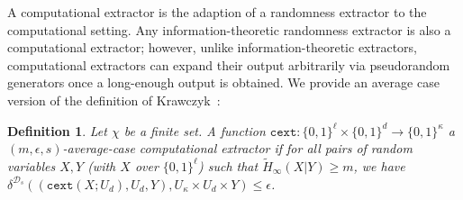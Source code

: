 \documentclass[11pt]{article}
\newcommand{\defref}[1]{\mbox{Definition~\ref{#1}}}
\newcommand{\class}[1]{{\ensuremath{\mathsf{#1}}}}
\newcommand{\gen}{\ensuremath{\class{Gen}}\xspace}
\newcommand{\rep}{\ensuremath{\class{Rep}}\xspace}
\newcommand{\zo}{\ensuremath{\{0, 1\}}}
\newcommand{\dis}{\ensuremath{\mathsf{dis}}}
\newcommand{\hill}{\ensuremath{\mathtt{HILL}}\xspace}
\newcommand{\cext}{\ensuremath{\mathtt{cext}}}
\newtheorem{definition}[theorem]{Definition}
\begin{document}
\iffalse
\begin{definition}
\label{def:comp fuzzy cond}
Let $\mathcal{W}$ be a family of probability distributions over $\mathcal{M}$.  A pair of randomized procedures ``generate'' ($\gen$) and ``reproduce'' ($\rep$) is an $(\mathcal{M}, \mathcal{W}, \tilde{m}, t$)-computational fuzzy conductor that is $(\epsilon, s)$-hard with error $\delta$ if $\gen$ and $\rep$ satisfy the following properties (the first two properties are the same as in \defref{def:comp fuzzy extractor}, with $x$ replacing $r$):
\begin{itemize}
\item The generate procedure $\gen$ on input $w\in \mathcal{M}$ outputs a string $x\in\{0,1\}^\ell$ and a helper string $p\in\{0,1\}^*$.
\item The reproduction procedure $\rep$ takes an element $w'\in\mathcal{M}$ and a bit string $p\in\{0,1\}^*$ as inputs.  The \emph{correctness} property guarantees that if $\dis(w, w')\leq t$ and $(x, p)\leftarrow \gen(w)$, then $\Pr[\rep(w',p) = x] \geq 1-\delta$ where the probability is over the randomness of $(\gen, \rep)$.
If $\dis(w, w') > t$, then no guarantee is provided about the output of $\rep$.
\item The \emph{security} property guarantees that for any distribution $W\in \mathcal{W}$, the string $x$ has high HILL entropy conditioned on $P$.  That is $H^{\hill}_{\epsilon_{cond}, s_{cond}}(X |P)\geq \tilde{m}$.
\end{itemize}
\end{definition}
\fi 

A computational extractor is the adaption of a randomness extractor to the computational setting.  Any information-theoretic randomness extractor is also a computational extractor; however, unlike information-theoretic extractors, computational extractors can expand their output arbitrarily via pseudorandom generators once a long-enough output is obtained. We provide an average case version of the definition of Krawczyk~\cite{krawczyk2010cryptographic}:
\begin{definition}
Let $\chi$ be a finite set.
A function $\cext: \zo^\ell \times \{0,1\}^d \rightarrow \{0,1\}^\kappa$ a \emph{$(m, \epsilon, s)$-average-case computational extractor} if for all pairs
of random variables $X, Y$ (with $X$ over $\zo^\ell$) such that
$\tilde{H}_\infty(X|Y) \ge m$, we have $\delta^{\mathcal{D}_{s}}((\cext(X; U_d), U_d, Y), U_\kappa\times
U_d \times Y) \le \epsilon$.
\end{definition}
\end{document}
